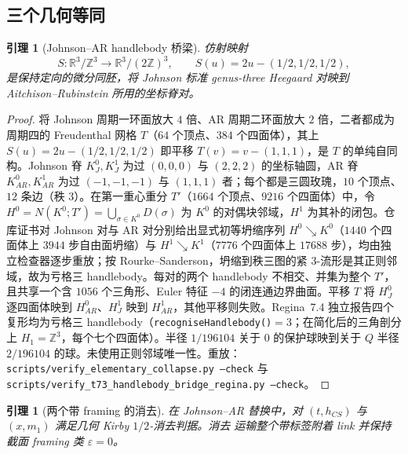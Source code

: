 \documentclass[11pt]{amsart}
\newtheorem{lemma}[theorem]{引理}
\theoremstyle{definition}
\theoremstyle{remark}
\begin{document}
\subsection{三个几何等同}

\begin{lemma}[Johnson--AR handlebody 桥梁]\label{lem:P0a}
仿射映射
\[
S:\mathbb R^3/\mathbb Z^3\longrightarrow
\mathbb R^3/(2\mathbb Z)^3,\qquad
S(u)=2u-(1/2,1/2,1/2),
\]
是保持定向的微分同胚，将 Johnson 标准
genus-three Heegaard 对映到 Aitchison--Rubinstein 所用的坐标脊对。
\end{lemma}

\begin{proof}
将 Johnson 周期一环面放大 $4$ 倍、AR 周期二环面放大 $2$ 倍，二者都成为周期四的 Freudenthal 网格 $T$（$64$ 个顶点、$384$ 个四面体），其上 $S(u)=2u-(1/2,1/2,1/2)$ 即平移 $T(v)=v-(1,1,1)$，是 $T$ 的单纯自同构。Johnson 脊 $K_J^0,K_J^1$ 为过 $(0,0,0)$ 与 $(2,2,2)$ 的坐标轴圆，AR 脊 $K_{AR}^0,K_{AR}^1$ 为过 $(-1,-1,-1)$ 与 $(1,1,1)$ 者；每个都是三圆玫瑰，$10$ 个顶点、$12$ 条边（秩 $3$）。在第一重心重分 $T'$（$1664$ 个顶点、$9216$ 个四面体）中，令 $H^0=N(K^0;T')=\bigcup_{\sigma\in K^0}D(\sigma)$ 为 $K^0$ 的对偶块邻域，$H^1$ 为其补的闭包。仓库证书对 Johnson 对与 AR 对分别给出显式初等坍缩序列 $H^0\searrow K^0$（$1440$ 个四面体上 $3944$ 步自由面坍缩）与 $H^1\searrow K^1$（$7776$ 个四面体上 $17688$ 步），均由独立检查器逐步重放；按 Rourke--Sanderson，坍缩到秩三图的紧 $3$-流形是其正则邻域，故为亏格三 handlebody。每对的两个 handlebody 不相交、并集为整个 $T'$，且共享一个含 $1056$ 个三角形、Euler 特征 $-4$ 的闭连通边界曲面。平移 $T$ 将 $H_J^0$ 逐四面体映到 $H_{AR}^0$、$H_J^1$ 映到 $H_{AR}^1$，其他平移则失败。Regina~7.4 独立报告四个复形均为亏格三 handlebody（\texttt{recogniseHandlebody()}$=3$；在简化后的三角剖分上 $H_1=\mathbb Z^3$，每个七个四面体）。半径 $1/196104$ 关于 $0$ 的保护球映到关于 $Q$ 半径 $2/196104$ 的球。未使用正则邻域唯一性。重放：\texttt{scripts/verify\_elementary\_collapse.py --check} 与 \texttt{scripts/verify\_t73\_handlebody\_bridge\_regina.py --check}。
\end{proof}

\begin{lemma}[两个带 framing 的消去]\label{lem:P0b}
在 Johnson--AR 替换中，对 \((t,h_{CS})\) 与 \((x,m_1)\)
满足几何 Kirby \(1/2\)-消去判据。消去
运输整个带标签附着 link 并保持截面 framing 类 \(\varepsilon=0\)。
\end{lemma}
\end{document}
